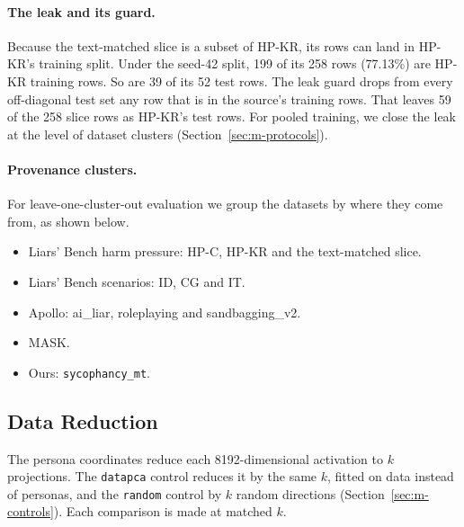 \paragraph{The leak and its guard.} Because the text-matched slice is a subset of HP-KR, its rows can land in HP-KR's training split. Under the seed-42 split, 199 of its 258 rows (77.13\%) are HP-KR training rows. So are 39 of its 52 test rows. %
The leak guard drops from every off-diagonal test set any row that is in the source's training rows. That leaves 59 of the 258 slice rows as HP-KR's test rows. %
For pooled training, we close the leak at the level of dataset clusters (Section~\ref{sec:m-protocols}).

\paragraph{Provenance clusters.} For leave-one-cluster-out evaluation we group the datasets by where they come from, as shown below. %
\begin{itemize}
\item Liars' Bench harm pressure: HP-C, HP-KR and the text-matched slice.
\item Liars' Bench scenarios: ID, CG and IT.
\item Apollo: ai\_liar, roleplaying and sandbagging\_v2.
\item MASK.
\item Ours: \texttt{sycophancy\_mt}.
\end{itemize}

\subsection{Data Reduction}
\label{sec:m-reduction}

The persona coordinates reduce each 8192-dimensional activation to $k$ projections. The \texttt{datapca} control reduces it by the same $k$, fitted on data instead of personas, and the \texttt{random} control by $k$ random directions (Section~\ref{sec:m-controls}). Each comparison is made at matched $k$.

